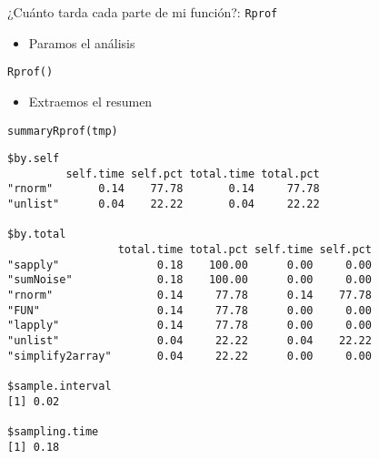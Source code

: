 \documentclass[xcolor={usenames,svgnames,dvipsnames}]{beamer}
\begin{document}
\begin{frame}[fragile,label={sec:orgf76c0f1}]{¿Cuánto tarda cada parte de mi función?: \texttt{Rprof}}
 \begin{itemize}
\item Paramos el análisis
\end{itemize}
\lstset{language=r,label= ,caption= ,captionpos=b,numbers=none}
\begin{lstlisting}
Rprof()
\end{lstlisting}

\begin{itemize}
\item Extraemos el resumen
\end{itemize}
\lstset{language=r,label= ,caption= ,captionpos=b,numbers=none}
\begin{lstlisting}
summaryRprof(tmp)
\end{lstlisting}

\begin{verbatim}
$by.self
         self.time self.pct total.time total.pct
"rnorm"       0.14    77.78       0.14     77.78
"unlist"      0.04    22.22       0.04     22.22

$by.total
                 total.time total.pct self.time self.pct
"sapply"               0.18    100.00      0.00     0.00
"sumNoise"             0.18    100.00      0.00     0.00
"rnorm"                0.14     77.78      0.14    77.78
"FUN"                  0.14     77.78      0.00     0.00
"lapply"               0.14     77.78      0.00     0.00
"unlist"               0.04     22.22      0.04    22.22
"simplify2array"       0.04     22.22      0.00     0.00

$sample.interval
[1] 0.02

$sampling.time
[1] 0.18
\end{verbatim}
\end{frame}
\end{document}
